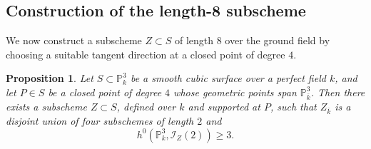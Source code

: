 \documentclass[a4paper,11pt]{amsart}
\numberwithin{equation}{section}
\newtheorem{proposition}[theorem]{Proposition}
\theoremstyle{definition}
\theoremstyle{remark}
\newcommand{\PP}{\mathbb P}
\newcommand{\CP}{\PP}
\begin{document}
\subsection{Construction of the length-8 subscheme}
\label{sec:arithmetic-tangent-double-points}

We now construct a subscheme $Z\subset S$ of length $8$ over the ground field by choosing a suitable tangent direction at a closed point of degree $4$. 

\begin{proposition}\label{prop:existence-of-Z}
Let $S\subset \CP^3_k$ be a smooth cubic surface over a perfect field $k$, and let $P\in S$ be a closed point of degree $4$ whose geometric points span $\CP^3_{\bar k}$.
Then there exists a subscheme $Z\subset S$, defined over $k$ and supported at $P$, such that $Z_{\bar k}$ is a disjoint union of four subschemes of length $2$ and
\[
  h^0(\CP^3_k,\mathcal I_Z(2))\geq 3.
\] 
\end{proposition}
\end{document}
